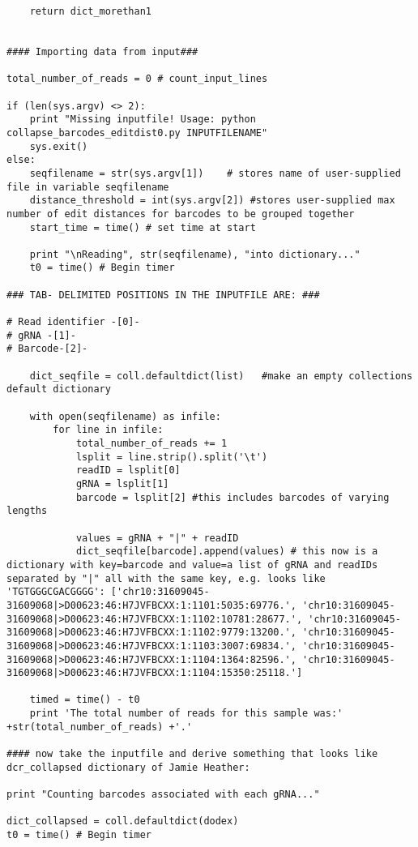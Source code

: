 \begin{footnotesize}
\begin{lstlisting}
    return dict_morethan1


#### Importing data from input###

total_number_of_reads = 0 # count_input_lines

if (len(sys.argv) <> 2):
    print "Missing inputfile! Usage: python collapse_barcodes_editdist0.py INPUTFILENAME"
    sys.exit()
else:
    seqfilename = str(sys.argv[1])    # stores name of user-supplied file in variable seqfilename
    distance_threshold = int(sys.argv[2]) #stores user-supplied max number of edit distances for barcodes to be grouped together
    start_time = time() # set time at start

    print "\nReading", str(seqfilename), "into dictionary..."
    t0 = time() # Begin timer

### TAB- DELIMITED POSITIONS IN THE INPUTFILE ARE: ###

# Read identifier -[0]-
# gRNA -[1]-
# Barcode-[2]-

    dict_seqfile = coll.defaultdict(list)   #make an empty collections default dictionary

    with open(seqfilename) as infile:
        for line in infile:
            total_number_of_reads += 1
            lsplit = line.strip().split('\t')
            readID = lsplit[0]
            gRNA = lsplit[1]
            barcode = lsplit[2] #this includes barcodes of varying lengths

            values = gRNA + "|" + readID
            dict_seqfile[barcode].append(values) # this now is a dictionary with key=barcode and value=a list of gRNA and readIDs separated by "|" all with the same key, e.g. looks like 'TGTGGGCGACGGGG': ['chr10:31609045-31609068|>D00623:46:H7JVFBCXX:1:1101:5035:69776.', 'chr10:31609045-31609068|>D00623:46:H7JVFBCXX:1:1102:10781:28677.', 'chr10:31609045-31609068|>D00623:46:H7JVFBCXX:1:1102:9779:13200.', 'chr10:31609045-31609068|>D00623:46:H7JVFBCXX:1:1103:3007:69834.', 'chr10:31609045-31609068|>D00623:46:H7JVFBCXX:1:1104:1364:82596.', 'chr10:31609045-31609068|>D00623:46:H7JVFBCXX:1:1104:15350:25118.']

    timed = time() - t0
    print 'The total number of reads for this sample was:' +str(total_number_of_reads) +'.'

#### now take the inputfile and derive something that looks like dcr_collapsed dictionary of Jamie Heather:

print "Counting barcodes associated with each gRNA..."

dict_collapsed = coll.defaultdict(dodex)
t0 = time() # Begin timer



\end{lstlisting}
\end{footnotesize}
